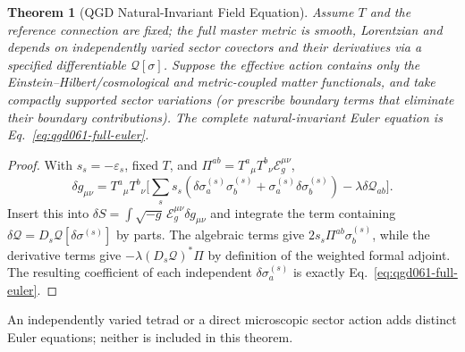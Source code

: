 \documentclass[11pt,a4paper]{article}
\newtheorem{theorem}{Theorem}[section]
\begin{document}
\begin{theorem}[QGD Natural-Invariant Field Equation]
\label{thm:qgd062-field-equation}
Assume $T$ and the reference connection are fixed; the full master
metric is smooth, Lorentzian and depends on independently varied
sector covectors and their derivatives via a specified differentiable
$\mathcal Q[\sigma]$. Suppose the effective action contains only the
Einstein--Hilbert/cosmological and metric-coupled matter functionals,
and take compactly supported sector variations (or prescribe boundary
terms that eliminate their boundary contributions). The complete
natural-invariant Euler equation is Eq.~\eqref{eq:qgd061-full-euler}.
\end{theorem}
\begin{proof}
With $s_s=-\varepsilon_s$, fixed $T$, and
$\Pi^{ab}=T^a{}_{\mu}T^b{}_{\nu}\mathcal E_g^{\mu\nu}$,
\[
\delta g_{\mu\nu}=T^a{}_{\mu}T^b{}_{\nu}
\biggl[\sum_s s_s(\delta\sigma_a^{(s)}\sigma_b^{(s)}
+\sigma_a^{(s)}\delta\sigma_b^{(s)})
-\lambda\delta\mathcal Q_{ab}\biggr].
\]
Insert this into $\delta S=\int\sqrt{-g}\,\mathcal E_g^{\mu\nu}
\delta g_{\mu\nu}$ and integrate the term containing
$\delta\mathcal Q=D_s\mathcal Q[\delta\sigma^{(s)}]$ by parts.
The algebraic terms give $2s_s\Pi^{ab}\sigma_b^{(s)}$,
while the derivative terms give
$-\lambda(D_s\mathcal Q)^*\Pi$ by definition of the
weighted formal adjoint. The resulting coefficient of each independent
$\delta\sigma_a^{(s)}$ is exactly Eq.~\eqref{eq:qgd061-full-euler}.
\end{proof}
\noindent An independently varied tetrad or a direct microscopic
sector action adds distinct Euler equations; neither is included
in this theorem.
\end{document}
